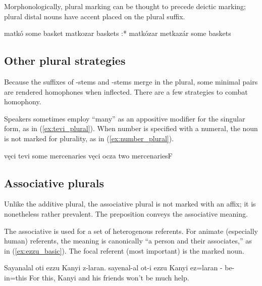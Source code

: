 Morphonologically, plural marking can be thought to precede deictic marking; plural distal nouns have accent placed on the plural suffix.

\begin{subexamples}
    \ex
        \script matkó
        \tr some basket
    \ex 
        \script matkozar
        \tr baskets
    \ex 
        \script:* matkózar
    \ex
        \script metkazár
        \tr some baskets
\end{subexamples}

\subsection{Other plural strategies}
Because the suffixes of -stems and -stems merge in the plural, some minimal pairs are rendered homophones when inflected. There are a few strategies to combat homophony. 

Speakers sometimes employ  “many” as an appositive modifier for the singular form, as in (\ref{ex:tevi_plural}). 
When number is specified with a numeral, the noun is not marked for plurality, as in (\ref{ex:number_plural}). 

\begin{subexamples}
    \ex \label{ex:tevi_plural}
        \script vęci tevi
        \tr some mercenaries
    \ex \label{ex:number_plural}
        \script vęci ocza
        \tr two mercenariesF
\end{subexamples}

\subsection{Associative plurals}
Unlike the additive plural, the associative plural is not marked with an affix; it is nonetheless rather prevalent. The preposition  conveys the associative meaning.%

The associative is used for a set of heterogenous referents. For animate (especially human) referents, the meaning is canonically “a person and their associates,” as in (\ref{ex:ezzu_basic}). The focal referent (\ie most important) is the marked noun.

\begin{example} \label{ex:ezzu_basic}
    \script Sayanalal oti ezzu Kanyi z-laran.
    \bits sayenal-al ot-i ezzu Kanyi ez=laran
    - be-   in=this
    \tr For this, Kanyi and his friends won't be much help.
\end{example}

